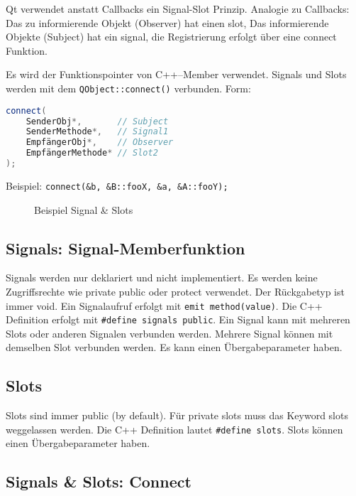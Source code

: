 Qt verwendet anstatt Callbacks ein Signal-Slot Prinzip. Analogie zu Callbacks: Das zu informierende Objekt (Observer) hat einen slot, Das informierende Objekte (Subject) hat ein signal, die Registrierung erfolgt über eine connect Funktion. 

Es wird der Funktionspointer von C++--Member verwendet. Signals und Slots werden mit dem \lstinline{QObject::connect()} verbunden. Form:
\begin{lstlisting}[language=c++]
connect(
    SenderObj*,       // Subject
    SenderMethode*,   // Signal1
    EmpfängerObj*,    // Observer
    EmpfängerMethode* // Slot2
);
\end{lstlisting}
Beispiel: \lstinline{connect(&b, &B::fooX, &a, &A::fooY);}

\begin{figure}[ht]
    \centering
    \caption{Beispiel Signal \& Slots}
\end{figure}


\subsection[Signals]{Signals: Signal-Memberfunktion}
Signals werden nur deklariert und nicht implementiert. Es werden keine Zugriffsrechte wie private public oder protect verwendet. Der Rückgabetyp ist immer void. Ein Signalaufruf erfolgt mit \lstinline{emit method(value)}. Die C++ Definition erfolgt mit \lstinline{#define signals public}. Ein Signal kann mit mehreren Slots oder anderen Signalen verbunden werden. Mehrere Signal können mit demselben Slot verbunden werden. Es kann einen Übergabeparameter haben.

\subsection{Slots}
Slots sind immer public (by default). Für private slots muss das Keyword slots weggelassen werden. Die C++ Definition lautet \lstinline{#define slots}. Slots können einen Übergabeparameter haben.

\subsection{Signals \& Slots: Connect}

